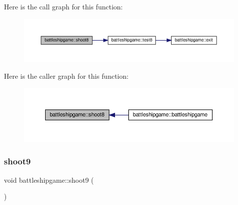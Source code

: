 Here is the call graph for this function\+:
\nopagebreak
\begin{figure}[H]
\begin{center}
\leavevmode
\includegraphics[width=350pt]{classbattleshipgame_a54920293bf8c78680cab53c79958e609_cgraph}
\end{center}
\end{figure}
Here is the caller graph for this function\+:
\nopagebreak
\begin{figure}[H]
\begin{center}
\leavevmode
\includegraphics[width=350pt]{classbattleshipgame_a54920293bf8c78680cab53c79958e609_icgraph}
\end{center}
\end{figure}
\mbox{\label{classbattleshipgame_adf78a189286f1bce1f6c291b4b7c72b4}} 
\subsubsection{\texorpdfstring{shoot9}{shoot9}}
{\footnotesize\ttfamily void battleshipgame\+::shoot9 (\begin{DoxyParamCaption}{ }\end{DoxyParamCaption})\hspace{0.3cm}{\ttfamily [slot]}}

